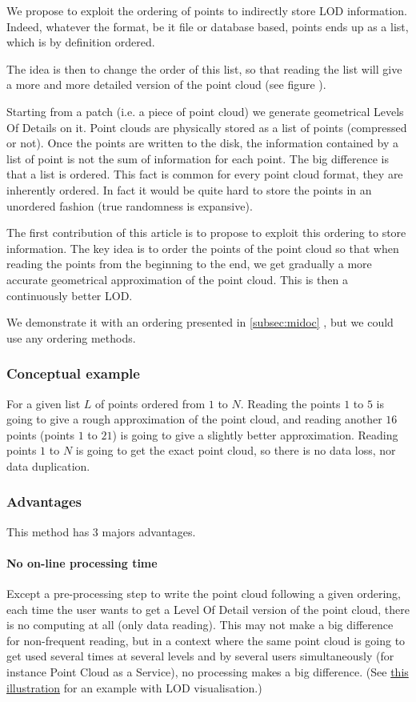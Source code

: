 			We propose to exploit the ordering of points to indirectly store LOD information.
			Indeed, whatever the format, be it file or database based, points ends up as a list, which is by definition ordered.
			
			The idea is then to change the order of this list, 
			so that reading the list will give a more and more detailed version of the point cloud (see figure ).
			
			Starting from a patch (i.e. a piece of point cloud) we generate geometrical Levels Of Details on it.
			Point clouds are physically stored as a list of points (compressed or not). 
			Once the points are written to the disk, the information contained by a list of point is not the sum of information for each point. The big difference is that a list is ordered.
			This fact is common for every point cloud format, they are inherently ordered. In fact it would be quite hard to store the points in an unordered fashion (true randomness is expansive).
			
			
			The first contribution of this article is to propose to exploit this ordering to store information.
			The key idea is to order the points of the point cloud so that when reading the points from the beginning to the end, we get gradually a more accurate geometrical approximation of the point cloud.
			This is then a continuously better LOD.
			
			We demonstrate it with an ordering presented in \ref{subsec:midoc} , but we could use any ordering methods.
			
		\subsubsection{Conceptual example}
			For a given list $L$ of points ordered from $1$ to $N$.
			Reading the points $1$ to $5$ is going to give a rough approximation of the point cloud, and reading another $16$ points (points $1$ to $21$) is going to give a slightly better approximation. Reading points $1$ to $N$ is going to get the exact point cloud, so there is no data loss, nor data duplication.
		
		\subsubsection{Advantages}
			This method has 3 majors advantages.
			\paragraph{No on-line processing time}
				Except a pre-processing step to write the point cloud following a given ordering, each time the user wants to get a Level Of Detail version of the point cloud, there is no computing at all (only data reading).
				This may not make a big difference for non-frequent reading, but in a context where the same point cloud is going to get used several times at several levels and by several users simultaneously (for instance Point Cloud as a Service), no processing makes a big difference.
				(See \href{fig:all_lod_illustration}{this illustration} for an example with LOD visualisation.) 		
